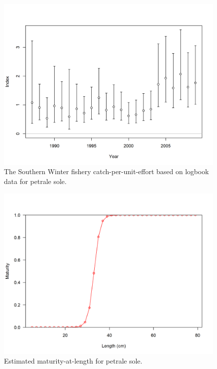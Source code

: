 \documentclass[12pt,]{article}
\begin{document}
\FloatBarrier

\begin{figure}
\centering
\includegraphics{r4ss/plots_mod1/index1_cpuedata_Winter (S).png}
\caption{The Southern Winter fishery catch-per-unit-effort based on
logbook data for petrale sole. \label{fig:south_cpue}}
\end{figure}

\FloatBarrier

\begin{figure}
\centering
\includegraphics{r4ss/plots_mod1/bio6_maturity.png}
\caption{Estimated maturity-at-length for petrale sole.
\label{fig:maturity}}
\end{figure}
\end{document}
